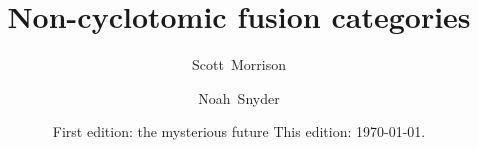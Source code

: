\title{Non-cyclotomic fusion categories}

\author{Scott~Morrison}
\address{
}%

\author{Noah~Snyder}
\address{
}%

\address{%
\rm URLs:\stdspace \tt \url{http://tqft.net/}  \rm and \tt \url{http://math.columbia.edu/~nsnyder}
}

\date{
  First edition: the mysterious future
  This edition: \today.
}

  
